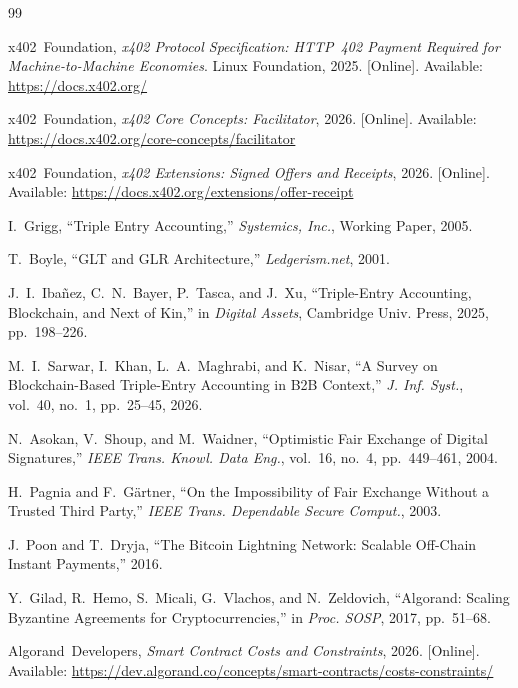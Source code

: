 \documentclass[journal]{IEEEtran}
\begin{document}

\begin{thebibliography}{99}

x402~Foundation, \emph{x402 Protocol Specification: HTTP~402
Payment Required for Machine-to-Machine Economies}.
Linux Foundation, 2025.
[Online]. Available: \url{https://docs.x402.org/}

x402~Foundation, \emph{x402 Core Concepts: Facilitator}, 2026.
[Online]. Available:
\url{https://docs.x402.org/core-concepts/facilitator}

x402~Foundation, \emph{x402 Extensions: Signed Offers and Receipts},
2026.
[Online]. Available:
\url{https://docs.x402.org/extensions/offer-receipt}

I.~Grigg, ``Triple Entry Accounting,'' \emph{Systemics, Inc.},
Working Paper, 2005.

T.~Boyle, ``GLT and GLR Architecture,'' \emph{Ledgerism.net}, 2001.

J.~I.~Iba\~{n}ez, C.~N.~Bayer, P.~Tasca, and J.~Xu, ``Triple-Entry
Accounting, Blockchain, and Next of Kin,'' in \emph{Digital Assets},
Cambridge Univ. Press, 2025, pp.~198--226.

M.~I.~Sarwar, I.~Khan, L.~A.~Maghrabi, and K.~Nisar, ``A Survey on
Blockchain-Based Triple-Entry Accounting in B2B Context,''
\emph{J. Inf. Syst.}, vol.~40, no.~1, pp.~25--45, 2026.

N.~Asokan, V.~Shoup, and M.~Waidner, ``Optimistic Fair Exchange of
Digital Signatures,'' \emph{IEEE Trans. Knowl. Data Eng.}, vol.~16,
no.~4, pp.~449--461, 2004.

H.~Pagnia and F.~G\"{a}rtner, ``On the Impossibility of Fair
Exchange Without a Trusted Third Party,'' \emph{IEEE Trans.
Dependable Secure Comput.}, 2003.

J.~Poon and T.~Dryja, ``The Bitcoin Lightning Network: Scalable
Off-Chain Instant Payments,'' 2016.

Y.~Gilad, R.~Hemo, S.~Micali, G.~Vlachos, and N.~Zeldovich,
``Algorand: Scaling Byzantine Agreements for Cryptocurrencies,''
in \emph{Proc. SOSP}, 2017, pp.~51--68.

Algorand~Developers, \emph{Smart Contract Costs and Constraints},
2026.
[Online]. Available:
\url{https://dev.algorand.co/concepts/smart-contracts/costs-constraints/}


\end{thebibliography}
\end{document}
